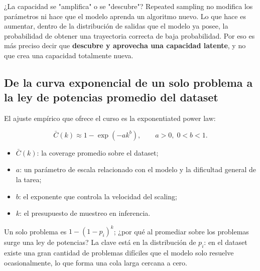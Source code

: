 
\begin{knowledgebox}{¿La capacidad se "amplifica" o se "descubre"?}
Repeated sampling no modifica los parámetros ni hace que el modelo aprenda un algoritmo nuevo. Lo que hace es aumentar, dentro de la distribución de salidas que el modelo ya posee, la probabilidad de obtener una trayectoria correcta de baja probabilidad. Por eso es más preciso decir que \textbf{descubre y aprovecha una capacidad latente}, y no que crea una capacidad totalmente nueva.
\end{knowledgebox}

\subsection{De la curva exponencial de un solo problema a la ley de potencias promedio del dataset}

El ajuste empírico que ofrece el curso es la exponentiated power law:

$$
\bar C(k)\approx 1-\exp(-a k^b),\qquad a>0,\;0<b<1.
$$

\begin{itemize}
    \item $\bar C(k)$: la coverage promedio sobre el dataset;
    \item $a$: un parámetro de escala relacionado con el modelo y la dificultad general de la tarea;
    \item $b$: el exponente que controla la velocidad del scaling;
    \item $k$: el presupuesto de muestreo en inferencia.
\end{itemize}


Un solo problema es $1-(1-p_i)^k$; ¿por qué al promediar sobre los problemas surge una ley de potencias? La clave está en la distribución de $p_i$: en el dataset existe una gran cantidad de problemas difíciles que el modelo solo resuelve ocasionalmente, lo que forma una cola larga cercana a cero.


